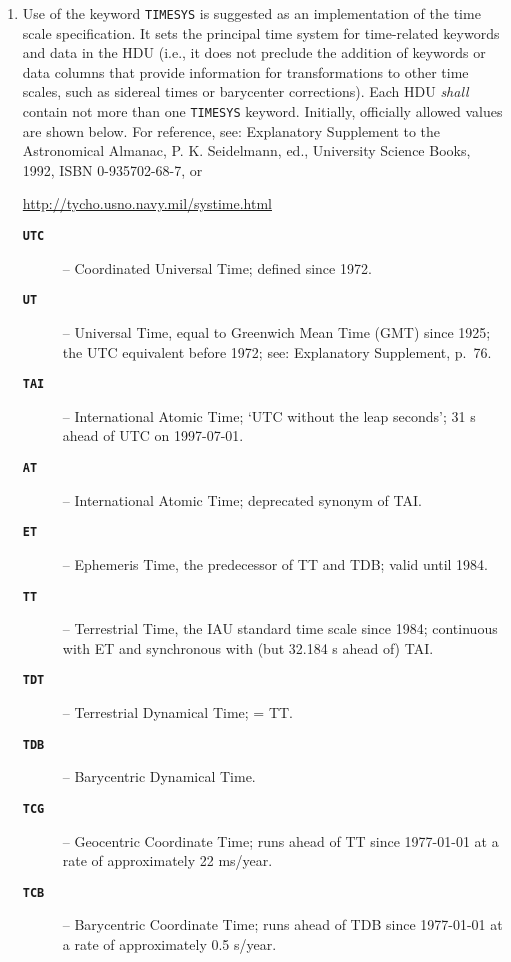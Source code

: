 \documentclass[onecolumn]{aa}
\begin{document}
\begin{enumerate} 
\item Use of the keyword {\tt TIMESYS} is suggested 
   as an implementation of the time
   scale specification.  It sets the principal time system for time-related
   keywords and data in the HDU (i.e., it does not preclude the addition of
   keywords or data columns that provide information for transformations to
   other time scales, such as sidereal times or barycenter corrections).
   Each HDU {\em shall} contain not more than one {\tt TIMESYS} keyword.
   Initially, officially allowed values are shown below.
      For reference, see:
      Explanatory Supplement to the Astronomical Almanac, P. K. Seidelmann,
        ed., University Science Books, 1992, ISBN 0-935702-68-7, or
   \begin{center}
      \url{http://tycho.usno.navy.mil/systime.html}
   \end{center}
   
  \begin{description}    
   \item[\bf {\tt UTC}] -- Coordinated Universal Time; defined since 1972.
   \item[\bf {\tt UT}] -- Universal Time, equal to Greenwich Mean Time (GMT) 
              since 1925; the UTC equivalent before 1972;
              see: Explanatory Supplement, p.\ 76.
   \item[\bf {\tt TAI}] -- International Atomic Time; `UTC without the 
              leap seconds'; 31 s ahead of UTC on 1997-07-01.
   \item[\bf {\tt AT}] -- International Atomic Time; deprecated synonym of TAI.
   \item[\bf {\tt ET}] -- Ephemeris Time, the predecessor of TT and TDB; valid until 
              1984.
   \item[\bf {\tt TT}] -- Terrestrial Time, the IAU standard time scale since 1984;
              continuous with ET and synchronous with (but 32.184 s 
              ahead of) TAI.
   \item[\bf {\tt TDT}] -- Terrestrial Dynamical Time; = TT.
   \item[\bf {\tt TDB}] -- Barycentric Dynamical Time.
   \item[\bf {\tt TCG}] -- Geocentric Coordinate Time; runs ahead of TT since 
              1977-01-01 at a rate of approximately 22 ms/year.
   \item[\bf {\tt TCB}] -- Barycentric Coordinate Time; runs ahead of TDB since 
              1977-01-01 at a rate of approximately 0.5 s/year.
  \end{description}


\end{enumerate}
\end{document}
